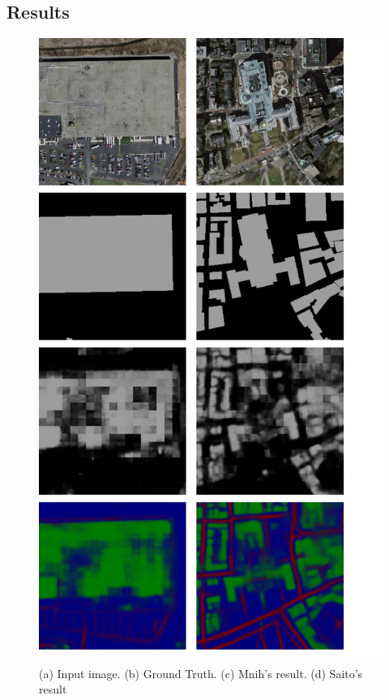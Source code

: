 \documentclass[runningheads]{llncs}
\begin{document}
\subsection{Results}

 \begin{figure}
\centering
\includegraphics[width=120mm]{ComparedResults}
\caption{(a) Input image. (b) Ground Truth. (c) Mnih's result. (d) Saito's result}
\label{fig:BadResults}
\end{figure}

\end{document}
